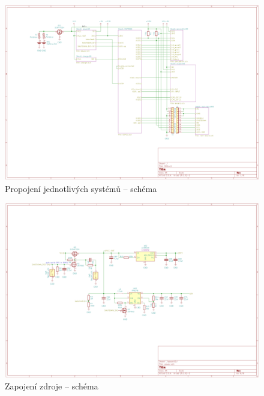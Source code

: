 \begin{figure}
    \centering
    \includegraphics[width=1.3\textheight, angle=90]{kapitoly/ctvrta_elektronicka_varianta/E4_zapojeni/B.B.pdf}
    \caption{Propojení jednotlivých systémů -- schéma}
    \label{fig:E4-sch_B.B}
\end{figure}
\begin{figure}
    \centering
    \includegraphics[width=\textwidth]{kapitoly/ctvrta_elektronicka_varianta/E4_zapojeni/zdroj.pdf}
    \caption{Zapojení zdroje -- schéma}
    \label{fig:E4-sch_zdroj}
\end{figure}

